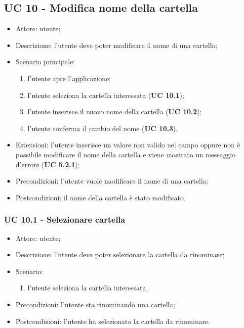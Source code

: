     \subsection{UC 10 - Modifica nome della cartella}
    \begin{itemize}
        \item Attore: utente;
        \item Descrizione: l'utente deve poter modificare il nome di una cartella;
        \item Scenario principale:
            \begin{enumerate}
            \item l’utente apre l'applicazione;
            \item l’utente seleziona la cartella interessata (\textbf{UC 10.1});
            \item l'utente inserisce il nuovo nome della cartella (\textbf{UC 10.2});
            \item l'utente conferma il cambio del nome (\textbf{UC 10.3}).            
            \end{enumerate}
        \item Estensioni: l'utente inserisce un valore non valido nel campo oppure non è possibile modificare il nome della cartella e viene mostrato un messaggio d'errore (\textbf{UC 5.2.1});
        \item Precondizioni: l'utente vuole modificare il nome di una cartella;
        \item Postcondizioni: il nome della cartella è stato modificato.
    \end{itemize}
    \subsubsection{UC 10.1 - Selezionare cartella}
    \begin{itemize}
        \item Attore: utente;
        \item Descrizione: l'utente deve poter selezionare la cartella da rinominare;
        \item Scenario:
        \begin{enumerate}
        \item l'utente seleziona la cartella interessata.
        \end{enumerate}
        \item Precondizioni: l'utente sta rinominando una cartella;
        \item Postcondizioni: l'utente ha selezionato la cartella da rinominare.
    \end{itemize}

